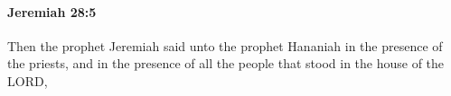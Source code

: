
		\paragraph{Jeremiah 28:5} %
			\label{JEREMIAH-28-5}

			Then the prophet Jeremiah said unto the prophet Hananiah in the presence of the priests, and in the presence of all the people that stood in the house of the LORD,


